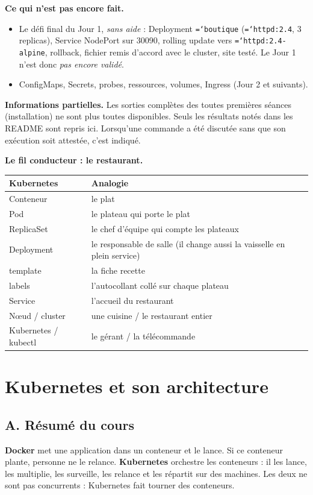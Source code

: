 \documentclass[11pt,a4paper]{article}
\newcommand{\cmd}[1]{\texttt{\hyphenchar\font=`\-#1}}
\newcommand{\partie}[1]{\needspace{9\baselineskip}\subsection*{#1}}
\begin{document}
\textbf{Ce qui n'est pas encore fait.}
\begin{itemize}
  \item Le défi final du Jour 1, \emph{sans aide} : Deployment \cmd{boutique} (\cmd{httpd:2.4}, 3 replicas), Service NodePort sur 30090, rolling update vers \cmd{httpd:2.4-alpine}, rollback, fichier remis d'accord avec le cluster, site testé. Le Jour 1 n'est donc \emph{pas encore validé}.
  \item ConfigMaps, Secrets, probes, ressources, volumes, Ingress (Jour 2 et suivants).
\end{itemize}

\textbf{Informations partielles.} Les sorties complètes des toutes premières séances (installation) ne sont plus toutes disponibles. Seuls les résultats notés dans les README sont repris ici. Lorsqu'une commande a été discutée sans que son exécution soit attestée, c'est indiqué.

\textbf{Le fil conducteur : le restaurant.}
\begin{center}
\begin{tabularx}{0.92\linewidth}{@{}lX@{}}
\toprule
\textbf{Kubernetes} & \textbf{Analogie} \\
\midrule
Conteneur & le plat \\
Pod & le plateau qui porte le plat \\
ReplicaSet & le chef d'équipe qui compte les plateaux \\
Deployment & le responsable de salle (il change aussi la vaisselle en plein service) \\
template & la fiche recette \\
labels & l'autocollant collé sur chaque plateau \\
Service & l'accueil du restaurant \\
Nœud / cluster & une cuisine / le restaurant entier \\
Kubernetes / kubectl & le gérant / la télécommande \\
\bottomrule
\end{tabularx}
\end{center}

\section{Kubernetes et son architecture}

\partie{A. Résumé du cours}
\textbf{Docker} met une application dans un conteneur et le lance. Si ce conteneur plante, personne ne le relance.
\textbf{Kubernetes} orchestre les conteneurs : il les lance, les multiplie, les surveille, les relance et les répartit sur des machines.
Les deux ne sont pas concurrents : Kubernetes fait tourner des conteneurs.
\end{document}

